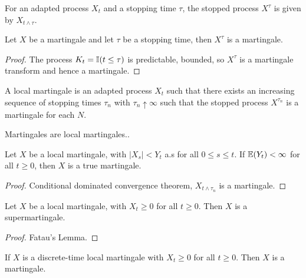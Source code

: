 \begin{defn}
  \label{sec:arbitrage-theory-9}
  For an adapted process $X_{t}$ and a stopping time $\tau$, the
  stopped process $X^{\tau}$ is given by $X_{t \wedge \tau}$.
\end{defn}

\begin{thm}
  \label{sec:arbitrage-theory-10}
  Let $X$ be a martingale and let $\tau$ be a stopping time, then
  $X^{\tau}$ is a martingale.
\end{thm}

\begin{proof}
  The process $K_{t} = \I{t \leq \tau}$  is predictable, bounded, so
  $X^{\tau}$ is a martingale transform and hence a martingale.
\end{proof}

\begin{defn}
  \label{sec:arbitrage-theory-11}
  A local martingale is an adapted process $X_{t}$ such that there
  exists an increasing sequence of stopping times $\tau_{n}$ with
  $\tau_{n} \uparrow \infty$ such that the stopped process
  $X^{\tau_{n}}$ is a martingale for each $N$.
\end{defn}

\begin{thm}
  \label{sec:arbitrage-theory-12}
  Martingales are local martingales..
\end{thm}

\begin{thm}
  \label{sec:arbitrage-theory-13}
  Let $X$ be a local martingale, with $|X_{s}| < Y_{t}$ a.s for all $0
  \leq s \leq t$.  If $\E{Y_{t}} < \infty$ for all $t \geq 0$, then
  $X$ is a true martingale.
\end{thm}

\begin{proof}
  Conditional dominated convergence theorem, $X_{t \wedge \tau_{n}}$
  is a martingale.
\end{proof}

\begin{thm}
  \label{sec:arbitrage-theory-15}
  Let $X$ be a local martingale, with $X_{t} \geq 0$ for all $t \geq
  0$.  Then $X$ is a supermartingale.
\end{thm}

\begin{proof}
  Fatau's Lemma.
\end{proof}

\begin{thm}
  \label{sec:arbitrage-theory-16}
  If $X$ is a discrete-time local martingale with $X_{t} \geq 0$ for
  all $t \geq 0$. Then $X$ is a martingale.
\end{thm}

